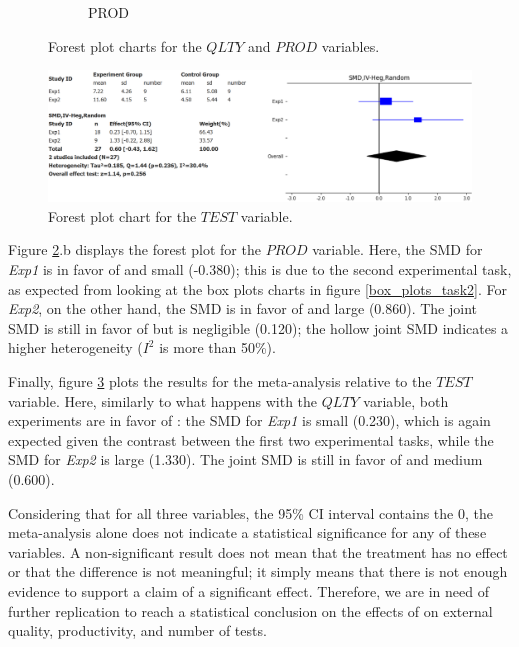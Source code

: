 \begin{figure}[H]
\begin{subfigure}{0.5\textwidth}
        \caption{PROD}
        \label{fp_prod}
    \end{subfigure}
    \caption{Forest plot charts for the $QLTY$ and $PROD$ variables.}
    \label{fp_qlty_prod}
\end{figure}

\begin{figure}[H]
    \includegraphics[width=\linewidth]{figures/forest_plots/TEST.png}
    \caption{Forest plot chart for the $TEST$ variable.}
    \label{fp_test}
\end{figure}\hfil

Figure \ref{fp_qlty_prod}.b displays the forest plot for the $PROD$ variable. Here, the SMD for \textit{Exp1} is in favor of \notdd and small (-0.380); this is due to the second experimental task, as expected from looking at the box plots charts in figure \ref{box_plots_task2}. For \textit{Exp2}, on the other hand, the SMD is in favor of \tdd and large (0.860). The joint SMD is still in favor of \tdd but is negligible (0.120); the hollow joint SMD indicates a higher heterogeneity ($I^2$ is more than 50\%).

Finally, figure \ref{fp_test} plots the results for the meta-analysis relative to the $TEST$ variable. Here, similarly to what happens with the $QLTY$ variable, both experiments are in favor of \tdd: the SMD for \textit{Exp1} is small (0.230), which is again expected given the contrast between the first two experimental tasks, while the SMD for \textit{Exp2} is large (1.330). The joint SMD is still in favor of \tdd and medium (0.600).
    
Considering that for all three variables, the 95\% CI interval contains the 0, the meta-analysis alone does not indicate a statistical significance for any of these variables.
A non-significant result does not mean that the treatment has no effect or that the difference is not meaningful; it simply means that there is not enough evidence to support a claim of a significant effect. Therefore, we are in need of further replication to reach a statistical conclusion on the effects of \tdd on external quality, productivity, and number of tests.



